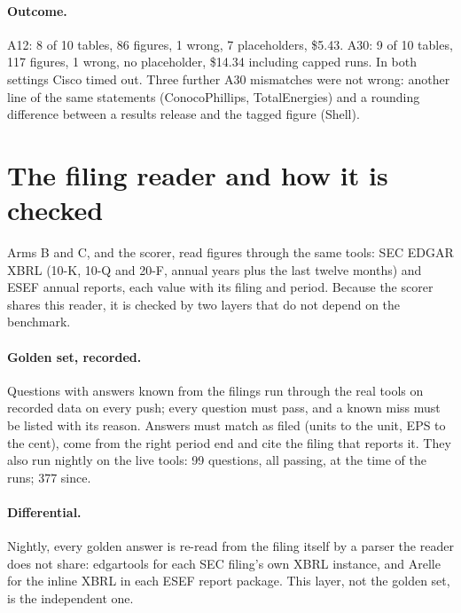 \documentclass[10pt,a4paper]{article}
\begin{document}
\paragraph{Outcome.} A12: 8 of 10 tables, 86 figures, 1 wrong, 7 placeholders, \$5.43. A30: 9 of 10 tables, 117
figures, 1 wrong, no placeholder, \$14.34 including capped runs. In both settings Cisco timed out. Three further A30
mismatches were not wrong: another line of the same statements (ConocoPhillips, TotalEnergies) and a rounding
difference between a results release and the tagged figure (Shell).

\section{The filing reader and how it is checked}
\label{app:reader}

Arms B and C, and the scorer, read figures through the same tools: SEC EDGAR XBRL (10-K, 10-Q and 20-F, annual
years plus the last twelve months) and ESEF annual reports, each value with its filing and period. Because the scorer
shares this reader, it is checked by two layers that do not depend on the benchmark.

\paragraph{Golden set, recorded.} Questions with answers known from the filings run through the real tools on
recorded data on every push; every question must pass, and a known miss must be listed with its reason. Answers must
match as filed (units to the unit, EPS to the cent), come from the right period end and cite the filing that reports
it. They also run nightly on the live tools: 99 questions,
all passing, at the time of the runs; 377 since.

\paragraph{Differential.} Nightly, every golden answer is re-read from the filing itself by a parser the reader does
not share: edgartools for each SEC filing's own XBRL instance, and Arelle for the inline XBRL in each ESEF report
package. This layer, not the golden set, is the independent one.
\end{document}

